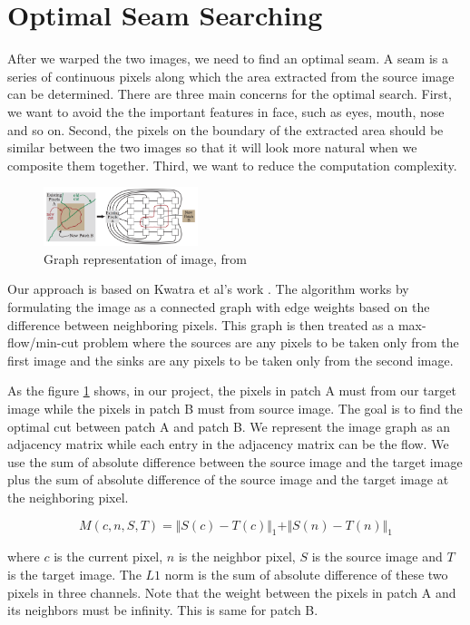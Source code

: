 \documentclass[10pt,twocolumn,letterpaper]{article}
\begin{document}
\section{Optimal Seam Searching}
\label{sec:searching}
After we warped the two images, we need to find an optimal seam. A seam is a series of continuous pixels along which the area extracted from the source image can be determined. There are three main concerns for the optimal search. First, we want to avoid the the important features in face, such as eyes, mouth, nose and so on. Second, the pixels on the boundary of the extracted area should be similar between the two images so that it will look more natural when we composite them together. Third, we want to reduce the computation complexity.


\begin{figure}[hb]
  \centering
  \includegraphics[width=0.4\textwidth]{graph_image.png}
  \caption{Graph representation of image, from \cite{kwatra2003graphcut}}\label{graph}
\end{figure}


Our approach is based on Kwatra et al's work \cite{kwatra2003graphcut}. The algorithm works by formulating the image as a connected graph with edge weights based on the difference between neighboring pixels. This graph is then treated as a max-flow/min-cut problem where the sources are any pixels to be taken only from the first image and the sinks are any pixels to be taken only from the second image.

As the figure \ref{graph} shows, in our project, the pixels in patch A must from our target image while the pixels in patch B must from source image. The goal is to find the optimal cut between patch A and patch B. We represent the image graph as an adjacency matrix while each entry in the adjacency matrix can be the flow. We use the sum of absolute difference between the source image and the target image plus the sum of absolute difference of the source image and the target image at the neighboring pixel.

\begin{equation}
M(c,n,S,T) = \Vert S(c) - T(c) \Vert_1 + \Vert S(n) - T(n) \Vert_1
\end{equation}

where $c$ is the current pixel, $n$ is the neighbor pixel, $S$ is the source image and $T$ is the target image. The $L1$ norm is the sum of absolute difference of these two pixels in three channels. Note that the weight between the pixels in patch A and its neighbors must be infinity. This is same for patch B.
\end{document}
